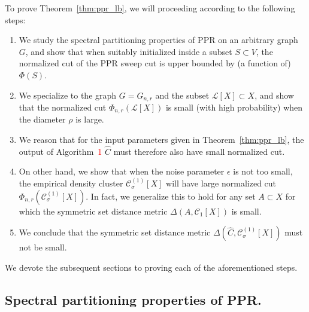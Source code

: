 \documentclass[11pt,twoside]{article}
\newcommand{\1}{\mathbf{1}}
\newcommand{\Xbf}{X}             %
\newcommand{\Cset}{\mathcal{C}}
\newcommand{\Csig}{\Cset_{\sigma}}
\begin{document}
To prove Theorem~\ref{thm:ppr_lb}, we will proceeding according to the following steps:
\begin{enumerate}
	\item We study the spectral partitioning properties of PPR on an arbitrary graph $G$, and show that when suitably initialized inside a subset $S \subset V$, the normalized cut of the PPR sweep cut is upper bounded by (a function of) $\Phi(S)$. 
	\item We specialize to the graph $G = G_{n,r}$ and the subset $\mathcal{L}[\Xbf] \subset \Xbf$, and show that the normalized cut $\Phi_{n,r}(\mathcal{L}[\Xbf])$ is small (with high probability) when the diameter $\rho$ is large.
	\item We reason that for the input parameters given in Theorem~\ref{thm:ppr_lb}, the output of Algorithm~\textcolor{red}{1} $\widehat{C}$ must therefore also have small normalized cut.
	\item On other hand, we show that when the noise parameter $\epsilon$ is not too small, the empirical density cluster $\Csig^{(1)}[\Xbf]$ will have large normalized cut $\Phi_{n,r}(\Csig^{(1)}[\Xbf])$. In fact, we generalize this to hold for any set $A \subset \Xbf$ for which the symmetric set distance metric $\Delta(A,\Cset_1[\Xbf])$ is small.
	\item We conclude that the symmetric set distance metric $\Delta(\widehat{C},\Csig^{(1)}[\Xbf])$ must not be small.
\end{enumerate}

We devote the subsequent sections to proving each of the aforementioned steps.

\subsection{Spectral partitioning properties of PPR.}
\end{document}
